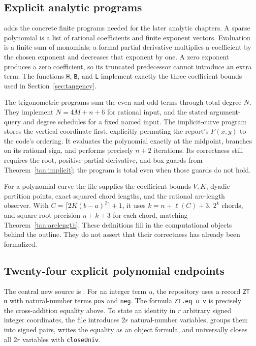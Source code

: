 \subsection{Explicit analytic programs}

 adds the concrete finite programs needed for
the later analytic chapters.  A sparse polynomial is a list of rational
coefficients and finite exponent vectors.  Evaluation is a finite sum of
monomials; a formal partial derivative multiplies a coefficient by the chosen
exponent and decreases that exponent by one.  A zero exponent produces a zero
coefficient, so its truncated predecessor cannot introduce an extra term.
The functions \texttt{H}, \texttt{B}, and \texttt{L} implement exactly the three
coefficient bounds used in Section~\ref{sec:tangency}.

The trigonometric programs sum the even and odd terms through total degree $N$.
They implement $N=4M+n+6$ for rational input, and the stated argument-query and
degree schedules for a fixed named input.  The implicit-curve program stores
the vertical coordinate first, explicitly permuting the report's $F(x,y)$ to
the code's ordering.  It evaluates the polynomial exactly at the midpoint,
branches on its rational sign, and performs precisely $n+2$ iterations.
Its correctness still requires the root, positive-partial-derivative, and box
guards from Theorem~\ref{tan:implicit}; the program is total even when those
guards do not hold.

For a polynomial curve the file supplies the coefficient bounds $V,K$, dyadic
partition points, exact squared chord lengths, and the rational arc-length
observer.  With $C=\lceil2K(b-a)^2\rceil+1$, it uses
$k=n+\ell(C)+3$, $2^k$ chords, and square-root precision $n+k+3$ for each chord,
matching Theorem~\ref{tan:arclength}.  These definitions fill in the computational
objects behind the outline.  They do not assert that their correctness has
already been formalized.

\subsection{Twenty-four explicit polynomial endpoints}

The central new source is .  For an integer
term $u$, the repository uses a record \texttt{ZT n} with natural-number terms
\texttt{pos} and \texttt{neg}.  The formula \texttt{ZT.eq u v} is precisely the
cross-addition equality above.  To state an identity in $r$ arbitrary signed
integer coordinates, the file introduces $2r$ natural-number variables,
groups them into signed pairs, writes the equality as an object formula, and
universally closes all $2r$ variables with \texttt{closeUniv}.

